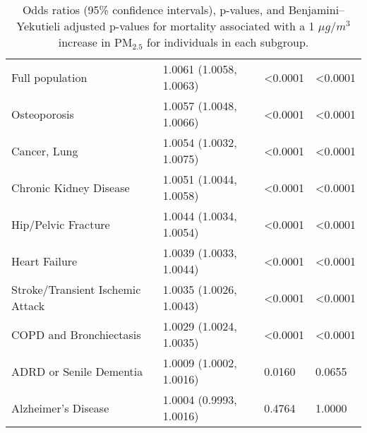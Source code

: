 \begin{table}[ht]
\begin{tabular}{llll}
  Full population & 1.0061 (1.0058, 1.0063) & \textless 0.0001 & \textless 0.0001 \\ 
  Osteoporosis & 1.0057 (1.0048, 1.0066) & \textless 0.0001 & \textless 0.0001 \\ 
  Cancer, Lung & 1.0054 (1.0032, 1.0075) & \textless 0.0001 & \textless 0.0001 \\ 
  Chronic Kidney Disease & 1.0051 (1.0044, 1.0058) & \textless 0.0001 & \textless 0.0001 \\ 
  Hip/Pelvic Fracture & 1.0044 (1.0034, 1.0054) & \textless 0.0001 & \textless 0.0001 \\ 
  Heart Failure & 1.0039 (1.0033, 1.0044) & \textless 0.0001 & \textless 0.0001 \\ 
  Stroke/Transient Ischemic Attack & 1.0035 (1.0026, 1.0043) & \textless 0.0001 & \textless 0.0001 \\ 
  COPD and Bronchiectasis & 1.0029 (1.0024, 1.0035) & \textless 0.0001 & \textless 0.0001 \\ 
  ADRD or Senile Dementia & 1.0009 (1.0002, 1.0016) & 0.0160 & 0.0655 \\ 
  Alzheimer's Disease & 1.0004 (0.9993, 1.0016) & 0.4764 & 1.0000 \\ 
   \hline
\end{tabular}
\caption{Odds ratios (95\% confidence intervals), p-values, and Benjamini–Yekutieli
             adjusted p-values for mortality associated with a 1 \(\mu g/m^3\) increase in 
             PM\(_{2.5}\) for individuals in each subgroup.} 
\label{tab:subpop_effects}
\end{table}
